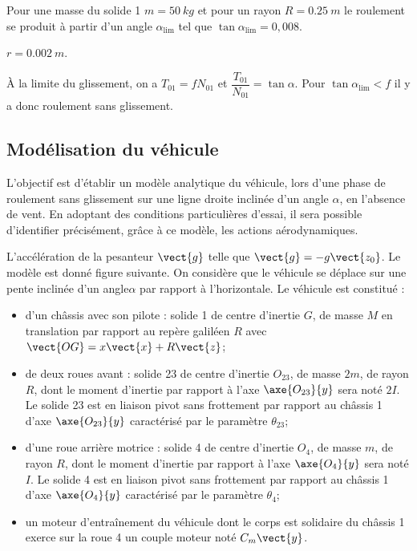 Pour une masse du solide 1 $m = \SI{50}{kg}$ et pour un rayon $R = \SI{0,25}{m}$ le roulement se produit à partir d’un angle  $\alpha_{\text{lim}}$ tel que $\tan \alpha_{\text{lim}} = 0,008$. 

\ifprof
\begin{corrige}
$r=\SI{0,002}{m}$.
\end{corrige}
\else
\fi


\ifprof
\begin{corrige}
À la limite du glissement, on a $T_{01}=fN_{01}$ et $\dfrac{T_{01}}{N_{01}}=\tan\alpha$. Pour $\tan \alpha_{\text{lim}}<f$ il y a donc roulement sans glissement. 
\end{corrige}
\else
\fi
\subsection*{Modélisation du véhicule}

\ifprof
\else

L’objectif est d’établir un modèle analytique du véhicule, lors d’une phase de roulement sans glissement sur une ligne droite inclinée d’un angle $\alpha$, en l’absence de vent. En adoptant des conditions particulières d’essai, il sera possible d’identifier précisément, grâce à ce modèle, les actions aérodynamiques. 

L’accélération de la pesanteur $\vect{g}$ telle que $\vect{g}=-g\vect{z_0}$. Le modèle est donné figure suivante. On considère que le véhicule se déplace sur une pente inclinée d’un angle$\alpha$ par rapport à l’horizontale. Le véhicule est constitué :
\begin{itemize}
\item  d’un châssis avec son pilote : solide 1 de centre d’inertie $G$, de masse $M$ en translation par rapport au repère galiléen $R$ avec $\vect{OG}=x\vect{x}+R\vect{z}$;
\item de deux roues avant : solide 23 de centre d’inertie $O_{23}$, de masse $2 m$, de rayon $R$, dont le moment d’inertie par rapport à l’axe $\axe{O_{23}}{{y}}$ sera noté $2I$. Le solide 23 est en liaison pivot sans frottement par rapport au châssis 1 d’axe $\axe{O_{23}}{{y}}$ caractérisé par le paramètre $\theta_{23}$;
\item d’une roue arrière motrice : solide 4 de centre d’inertie $O_4$, de masse $m$, de rayon $R$, dont le moment d’inertie par rapport à l’axe $\axe{O_{4}}{{y}}$ sera noté $I$. Le solide 4 est en liaison pivot sans frottement par rapport au châssis 1 d’axe $\axe{O_{4}}{{y}}$ caractérisé par le paramètre $\theta_4$; 
\item un moteur d’entraînement du véhicule dont le corps est solidaire du châssis 1 exerce sur la roue 4 un couple moteur noté $C_m \vect{y}$. 
\end{itemize}


